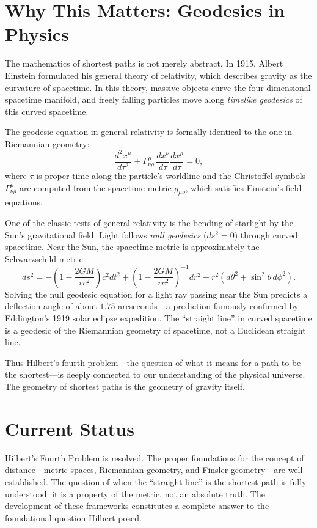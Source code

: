 \section{Why This Matters: Geodesics in Physics}

The mathematics of shortest paths is not merely abstract. In 1915, Albert Einstein formulated his general theory of relativity, which describes gravity as the curvature of spacetime. In this theory, massive objects curve the four-dimensional spacetime manifold, and freely falling particles move along \emph{timelike geodesics} of this curved spacetime.

The geodesic equation in general relativity is formally identical to the one in Riemannian geometry:
\[
\frac{d^2 x^\mu}{d\tau^2} + \Gamma^\mu_{\nu\rho}\,\frac{dx^\nu}{d\tau}\frac{dx^\rho}{d\tau} = 0,
\]
where $\tau$ is proper time along the particle's worldline and the Christoffel symbols $\Gamma^\mu_{\nu\rho}$ are computed from the spacetime metric $g_{\mu\nu}$, which satisfies Einstein's field equations.

\begin{example}
One of the classic tests of general relativity is the bending of starlight by the Sun's gravitational field. Light follows \emph{null geodesics} ($ds^2 = 0$) through curved spacetime. Near the Sun, the spacetime metric is approximately the Schwarzschild metric
\[
ds^2 = -\left(1-\frac{2GM}{rc^2}\right)c^2 dt^2 + \left(1-\frac{2GM}{rc^2}\right)^{-1}dr^2 + r^2(d\theta^2 + \sin^2\theta\,d\phi^2).
\]
Solving the null geodesic equation for a light ray passing near the Sun predicts a deflection angle of about $1.75$ arcseconds---a prediction famously confirmed by Eddington's 1919 solar eclipse expedition. The ``straight line'' in curved spacetime is a geodesic of the Riemannian geometry of spacetime, not a Euclidean straight line.
\end{example}

Thus Hilbert's fourth problem---the question of what it means for a path to be the shortest---is deeply connected to our understanding of the physical universe. The geometry of shortest paths is the geometry of gravity itself.

\section{Current Status}

\begin{solvedbox}
Hilbert's Fourth Problem is resolved. The proper foundations for the concept of distance---metric spaces, Riemannian geometry, and Finsler geometry---are well established. The question of when the ``straight line'' is the shortest path is fully understood: it is a property of the metric, not an absolute truth. The development of these frameworks constitutes a complete answer to the foundational question Hilbert posed.
\end{solvedbox}

